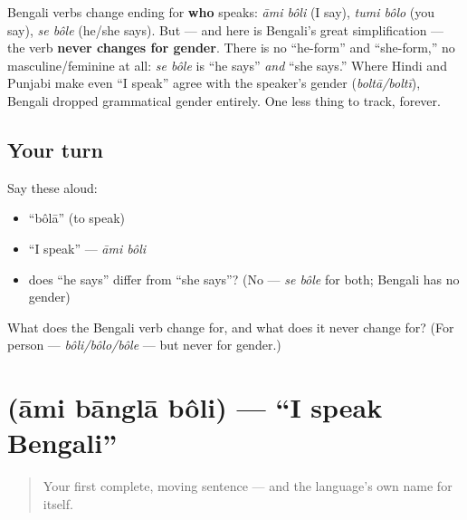 \begin{grammarlens}[title={Grammar Lens: the verb changes for person — but \emph{never} for gender}]
Bengali verbs change ending for \textbf{who} speaks: \emph{āmi bôli} (I say), \emph{tumi bôlo} (you say), \emph{se bôle} (he/she says). But — and here is Bengali's great simplification — the verb \textbf{never changes for gender}. There is no \textquotedblleft{}he-form\textquotedblright{} and \textquotedblleft{}she-form,\textquotedblright{} no masculine/feminine at all: \emph{se bôle} is \textquotedblleft{}he says\textquotedblright{} \emph{and} \textquotedblleft{}she says.\textquotedblright{} Where Hindi and Punjabi make even \textquotedblleft{}I speak\textquotedblright{} agree with the speaker's gender (\emph{boltā/boltī}), Bengali dropped grammatical gender entirely. One less thing to track, forever.
\end{grammarlens}

\subsection*{Your turn}
Say these aloud:

\begin{itemize}
\raggedright
  \item \textquotedblleft{}bôlā\textquotedblright{} (to speak)
  \item \textquotedblleft{}I speak\textquotedblright{} — \emph{āmi bôli}
  \item does \textquotedblleft{}he says\textquotedblright{} differ from \textquotedblleft{}she says\textquotedblright{}? (No — \emph{se bôle} for both; Bengali has no gender)
\end{itemize}

\begin{tcolorbox}[breakable,colback=teal!4,colframe=teal!35!black,title={Before you move on}]
What does the Bengali verb change for, and what does it never change for? (For person — \emph{bôli/bôlo/bôle} — but never for gender.)
\end{tcolorbox}
\section[āmi bānglā bôli]{   (āmi bānglā bôli) — \textquotedblleft{}I speak Bengali\textquotedblright{}}

\label{lesson:BN-C05-ami-bangla-boli}



\begin{quote}
Your first complete, moving sentence — and the language's own name for itself.
\end{quote}

